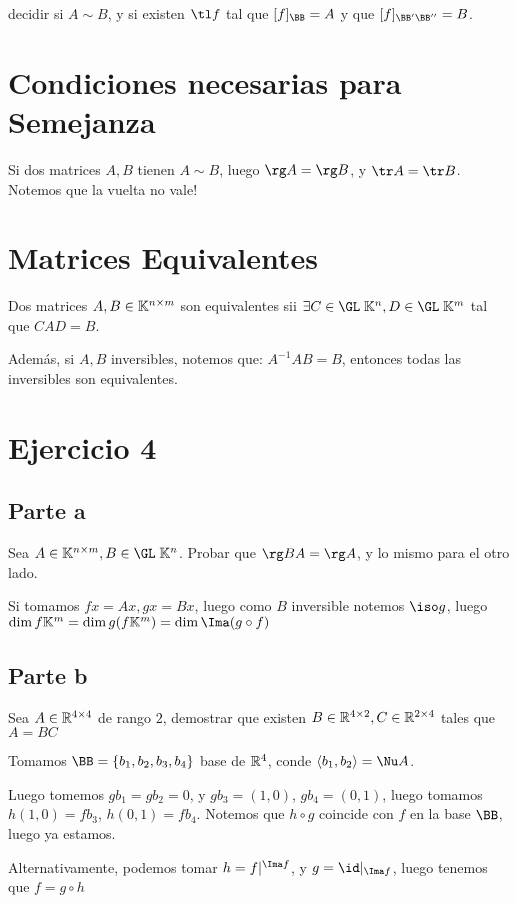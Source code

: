 \documentclass{article}
\begin{document}
decidir si $A \sim B$, y si existen $\tl f$ tal que $[f]_\BB = A$ y que
$[f]_{\BB'\BB''} = B$.

\section*{Condiciones necesarias para Semejanza}
Si dos matrices $A, B$ tienen $A \sim B$, luego $\rg A = \rg B$, y $\tr A = \tr
B$. Notemos que la vuelta no vale!

\section*{Matrices Equivalentes}
Dos matrices $A, B \in \mathbb{K}^{n \times m}$ son equivalentes sii $\exists C \in
\GL \; \K^n, D \in \GL \; \K^m$ tal que $CAD = B$.

Además, si $A, B$ inversibles, notemos que:
$
A^{-1}AB = B
$, entonces todas las inversibles son equivalentes.

\section*{Ejercicio 4}
\subsection*{Parte a}
Sea $A \in \K^{n \times m}, B \in \GL \; \K^n$. Probar que $\rg BA = \rg A$, y
lo mismo para el otro lado.

Si tomamos $f x = Ax, gx = Bx$, luego como $B$ inversible notemos $\iso g$,
luego $\dim f \K^m = \dim g (f \K^m) = \dim \Ima (g \circ f)$

\subsection*{Parte b}
Sea $A \in \mathbb{R}^{4 \times 4}$ de rango $2$, demostrar que existen $B \in \mathbb{R}^{4
\times 2}, C \in \mathbb{R}^{2 \times 4}$ tales que $A = BC$

Tomamos $\BB = \{b_1, b_2, b_3, b_4\}$ base de $\mathbb{R}^4$, conde $\langle b_1, b_2
\rangle = \Nu A$.

Luego tomemos $g b_1 = g b_2 = 0$, y $g b_3 = (1, 0)$, $g b_4 = (0, 1)$, luego
tomamos $h (1, 0) = f b_3$, $h (0, 1) = f b_4$. Notemos que $h \circ g$
coincide con $f$ en la base $\BB$, luego ya estamos.

Alternativamente, podemos tomar $h = f|^{\Ima f}$, y $g = \id|_{\Ima f}$, luego
tenemos que $f = g \circ h$
\end{document}
